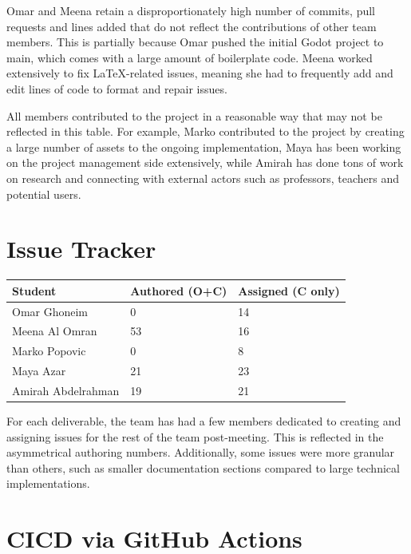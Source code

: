 \documentclass{article}
\begin{document}
Omar and Meena retain a disproportionately high number of commits, pull requests and lines added that do not reflect the contributions of other team members. This is partially because Omar pushed the initial Godot project to main, which comes with a large amount of boilerplate code. Meena worked extensively to fix LaTeX-related issues, meaning she had to frequently add and edit lines of code to format and repair issues.

All members contributed to the project in a reasonable way that may not be reflected in this table. For example, Marko contributed to the project by creating a large number of assets to the ongoing implementation, Maya has been working on the project management side extensively, while Amirah has done tons of work on research and connecting with external actors such as professors, teachers and potential users.

\section{Issue Tracker}

\begin{table}[H]
\centering
\begin{tabular}{lll}
\toprule
\textbf{Student} & \textbf{Authored (O+C)} & \textbf{Assigned (C only)}\\
\midrule
Omar Ghoneim & 0 & 14 \\
Meena Al Omran & 53 & 16 \\
Marko Popovic & 0 & 8 \\
Maya Azar & 21 & 23 \\
Amirah Abdelrahman & 19 & 21 \\
\bottomrule
\end{tabular}
\end{table}

For each deliverable, the team has had a few members dedicated to creating and assigning issues for the rest of the team post-meeting. This is reflected in the asymmetrical authoring numbers. Additionally, some issues were more granular than others, such as smaller documentation sections compared to large technical implementations. 

\section{CICD via GitHub Actions}

\end{document}
